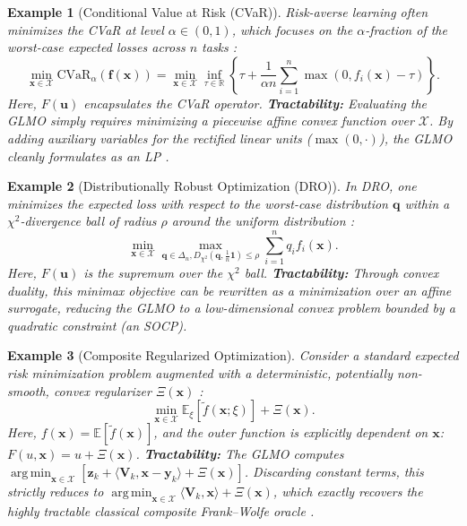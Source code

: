 \documentclass{article}
\newcommand{\cX}{\mathcal{X}}
\def\vf{{\bm{f}}}
\def\vu{{\bm{u}}}
\def\vx{{\bm{x}}}
\def\vy{{\bm{y}}}
\def\vz{{\bm{z}}}
\def\mV{{\bm{V}}}
\newcommand{\E}{\mathbb{E}}
\newcommand{\R}{\mathbb{R}}
\DeclareMathOperator*{\argmin}{arg\,min}
\newtheorem{example}{Example}
\begin{document}
\begin{example}[Conditional Value at Risk (CVaR)]
Risk-averse learning often minimizes the CVaR at level $\alpha \in (0,1)$, which focuses on the $\alpha$-fraction of the worst-case expected losses across $n$ tasks \citep{rockafellar2000optimization}:
\begin{equation}
    \min_{\vx \in \cX} \text{CVaR}_\alpha(\vf(\vx)) = \min_{\vx \in \cX} \inf_{\tau \in \R} \left\{ \tau + \frac{1}{\alpha n} \sum_{i=1}^n \max(0, f_i(\vx) - \tau) \right\}.
\end{equation}
Here, $F(\vu)$ encapsulates the CVaR operator. \textbf{Tractability:} Evaluating the GLMO simply requires minimizing a piecewise affine convex function over $\cX$. By adding auxiliary variables for the rectified linear units ($\max(0, \cdot)$), the GLMO cleanly formulates as an LP \citep{vladarean2023first}.
\end{example}

\begin{example}[Distributionally Robust Optimization (DRO)]
In DRO, one minimizes the expected loss with respect to the worst-case distribution $\mathbf{q}$ within a $\chi^2$-divergence ball of radius $\rho$ around the uniform distribution \citep{namkoong2016stochastic}:
\begin{equation}
    \min_{\vx \in \cX} \max_{\mathbf{q} \in \Delta_n, D_{\chi^2}(\mathbf{q}, \frac{1}{n}\mathbf{1}) \le \rho} \sum_{i=1}^n q_i f_i(\vx).
\end{equation}
Here, $F(\vu)$ is the supremum over the $\chi^2$ ball. \textbf{Tractability:} Through convex duality, this minimax objective can be rewritten as a minimization over an affine surrogate, reducing the GLMO to a low-dimensional convex problem bounded by a quadratic constraint (an SOCP).
\end{example}

\begin{example}[Composite Regularized Optimization]
Consider a standard expected risk minimization problem augmented with a deterministic, potentially non-smooth, convex regularizer $\Xi(\vx)$ \citep{yurtsever2018conditional}:
\begin{equation}
    \min_{\vx \in \cX} \E_{\xi}[\tilde{f}(\vx; \xi)] + \Xi(\vx).
\end{equation}
Here, $f(\vx) = \E[\tilde{f}(\vx)]$, and the outer function is explicitly dependent on $\vx$: $F(u, \vx) = u + \Xi(\vx)$. \textbf{Tractability:} The GLMO computes $\argmin_{\vx \in \cX} \left[ \vz_k + \langle \mV_k, \vx - \vy_k \rangle + \Xi(\vx) \right]$. Discarding constant terms, this strictly reduces to $\argmin_{\vx \in \cX} \langle \mV_k, \vx \rangle + \Xi(\vx)$, which exactly recovers the highly tractable classical composite Frank--Wolfe oracle \citep{yurtsever2018conditional}.
\end{example}
\end{document}

